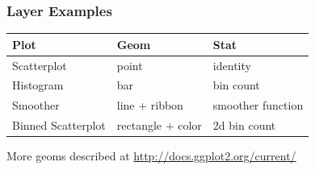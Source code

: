 \documentclass{beamer}\usepackage[]{graphicx}\usepackage[]{color}
\begin{document}

\begin{frame}
\frametitle{Layer Examples}

\begin{table}[ht]
\centering
\begin{tabular}{|l|ll|}
  \hline
Plot & Geom & Stat \\ 
  \hline
Scatterplot  & point  &  identity \\
Histogram  & bar  & bin count \\
Smoother  & line + ribbon & smoother function \\
Binned Scatterplot  & rectangle + color & 2d bin count \\
   \hline
\end{tabular}
\end{table}
    
More geoms described at \url{http://docs.ggplot2.org/current/}
\end{frame}

\end{document}
